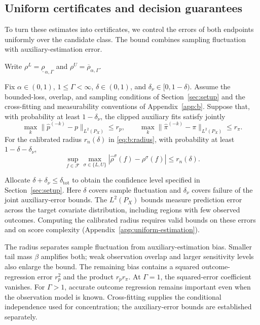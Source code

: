 \subsection{Uniform certificates and decision guarantees}
\label{sec:uniform-certificates}
To turn these estimates into certificates, we control the errors of both endpoints uniformly over the candidate class. The bound combines sampling fluctuation with auxiliary-estimation error.

Write \(\rho^L=\underline\rho_{\alpha,\Gamma}\) and \(\rho^U=\overline\rho_{\alpha,\Gamma}\).

\begin{theorem}
\label{thm:learning}
Fix \(\alpha\in(0,1)\), \(1\le\Gamma<\infty\), \(\delta\in(0,1)\), and \(\delta_\nu\in[0,1-\delta)\). Assume the bounded-loss, overlap, and sampling conditions of Section~\ref{sec:setup} and the cross-fitting and measurability conventions of Appendix~\ref{app:b}. Suppose that, with probability at least \(1-\delta_\nu\), the clipped auxiliary fits satisfy jointly
\[
 \max_k\|\widehat p^{(-k)}-p\|_{L^2(P_X)}\le r_p,
 \qquad
 \max_k\|\widehat\pi^{(-k)}-\pi\|_{L^2(P_X)}\le r_\pi.
\]
For the calibrated radius \(r_n(\delta)\) in \eqref{eq:b:radius}, with probability at least \(1-\delta-\delta_\nu\),
\begin{equation}
 \sup_{f\in\mathcal F}\max_{\sigma\in\{L,U\}}
 |\widehat\rho^\sigma(f)-\rho^\sigma(f)|\le r_n(\delta).
\label{eq:uniform-endpoints}
\end{equation}
\end{theorem}

Allocate \(\delta+\delta_\nu\le\delta_{\mathrm{tot}}\) to obtain the confidence level specified in
Section~\ref{sec:setup}. Here \(\delta\) covers sample fluctuation and \(\delta_\nu\) covers failure
of the joint auxiliary-error bounds. The \(L^2(P_X)\) bounds measure prediction error across the
target covariate distribution, including regions with few observed outcomes. Computing the
calibrated radius requires valid bounds on these errors and on score complexity
(Appendix~\ref{app:uniform-estimation}).

The radius separates sample fluctuation from auxiliary-estimation bias. Smaller tail mass \(\beta\)
amplifies both; weak observation overlap and larger sensitivity levels also enlarge the bound. The
remaining bias contains a squared outcome-regression error \(r_p^2\) and the product \(r_pr_\pi\).
At \(\Gamma=1\), the squared-error coefficient vanishes. For \(\Gamma>1\), accurate outcome
regression remains important even when the observation model is known. Cross-fitting supplies the
conditional independence used for concentration; the auxiliary-error bounds are established
separately.

